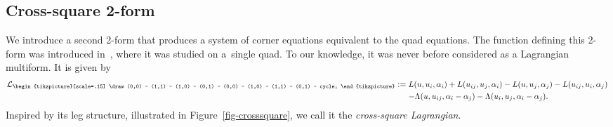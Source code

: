 \documentclass[10pt,a4paper]{amsart}
\newcommand{\crosssquare}{{\begin{tikzpicture}[scale=.15]
			\draw (0,0) -- (1,1) -- (1,0) -- (0,1) -- (0,0) -- (1,0) -- (1,1) -- (0,1) -- cycle;
\end{tikzpicture}}}
\newcommand{\cL}{\mathcal{L}}
\numberwithin{equation}{section}
\begin{document}
\subsection{Cross-square 2-form}

We introduce a second 2-form that produces a system of corner equations equivalent to the quad equations. The function defining this 2-form was introduced in~\cite{bobenko2010lagrangian}, where it was studied on a~single quad. To our knowledge, it was never before considered as a Lagrangian multiform. It is given by
\begin{align*}
\begin{split}
		\cL_\crosssquare:={}& L(u,u_i,\alpha_i) + L(u_{ij},u_j, \alpha_i) - L(u,u_j,\alpha_j) - L(u_{ij},u_i, \alpha_j) \\
		&{}{-} \Lambda(u,u_{ij},\alpha_i-\alpha_j) - \Lambda(u_i,u_j,\alpha_i-\alpha_j).
\end{split}
\end{align*}
Inspired by its leg structure, illustrated in Figure~\ref{fig-crosssquare}, we call it the \emph{cross-square Lagrangian}.
\end{document}
